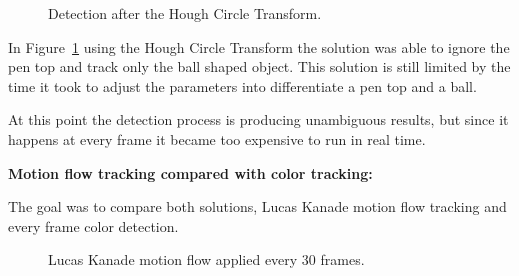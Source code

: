 \documentclass[10pt,twocolumn,letterpaper]{article}
\begin{document}
  \begin{figure}[!h]
    \centering
    \setlength{\fboxsep}{1pt}
    \setlength{\fboxrule}{1pt}
    \caption{Detection after the Hough Circle Transform.}\label{fig:yes_hough}
  \end{figure}

  In Figure~\ref{fig:yes_hough} using the Hough Circle Transform the solution
  was able to ignore the pen top and track only the ball shaped object. This
  solution is still limited by the time it took to adjust the parameters into
  differentiate a pen top and a ball.

  At this point the detection process is producing unambiguous results, but
  since it happens at every frame it became too expensive to run in real time.

  \bigbreak{}
  \textbf{Motion flow tracking compared with color tracking:}
  \bigbreak{}

  The goal was to compare both solutions, Lucas Kanade motion flow tracking and
  every frame color detection.

  \begin{figure}[!h]
    \centering
    \setlength{\fboxsep}{1pt}
    \setlength{\fboxrule}{1pt}
    \caption{Lucas Kanade motion flow applied every 30 frames.}\label{fig:motion_30}
  \end{figure}
\end{document}
